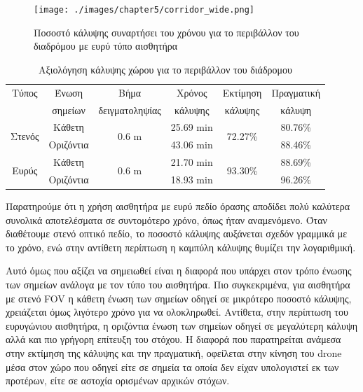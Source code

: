 \begin{figure}[!ht]
    \texttt{[image: ./images/chapter5/corridor\_wide.png]}
    \caption{Ποσοστό κάλυψης συναρτήσει του χρόνου για το περιβάλλον του διαδρόμου με ευρύ τύπο αισθητήρα}
     \label{fig:corridor_wide}
\end{figure} 

\begin{table}[!ht]
    \begin{center}
        \caption{Αξιολόγηση κάλυψης χώρου για το περιβάλλον του διάδρομου}
        \label{tab:coverage_corridor}
        \begin{tabular}{ | c | c | c | c | c | c |}
        \hline
        \rowcolor{Gray}
        Τύπος                   & Ένωση     & Βήμα                        & Χρόνος         & Εκτίμηση                 & Πραγματική \\
        \rowcolor{Gray}
                                & σημείων   & δειγματοληψίας              & κάλυψης        & κάλυψης                  & κάλυψη     \\
        \hline
        \multirow{2}{*}{Στενός} & Κάθετη    & \multirow{2}{*}{0.6 \si{m}} & 25.69 \si{min} & \multirow{2}{*}{72.27\%} & 80.76\%    \\
        \cline{2-2}\cline{4-4}\cline{6-6}
                                & Οριζόντια &                             & 43.06 \si{min} &                          & 88.46\%    \\
        \hline
        \multirow{2}{*}{Ευρύς} & Κάθετη     & \multirow{2}{*}{0.6 \si{m}} & 21.70 \si{min} & \multirow{2}{*}{93.30\%} & 88.69\%    \\
        \cline{2-2}\cline{4-4}\cline{6-6}
                               & Οριζόντια  &                             & 18.93 \si{min} &                          & 96.26\%    \\
        \hline
        \end{tabular}
    \end{center}
\end{table}

Παρατηρούμε ότι η χρήση αισθητήρα με ευρύ πεδίο όρασης αποδίδει πολύ καλύτερα συνολικά αποτελέσματα σε συντομότερο χρόνο, όπως ήταν αναμενόμενο. Όταν διαθέτουμε στενό οπτικό πεδίο, το ποσοστό κάλυψης αυξάνεται σχεδόν γραμμικά με το χρόνο, ενώ στην αντίθετη περίπτωση η καμπύλη κάλυψης θυμίζει την λογαριθμική.
    
Αυτό όμως που αξίζει να σημειωθεί είναι η διαφορά που υπάρχει στον τρόπο ένωσης των σημείων ανάλογα με τον τύπο του αισθητήρα. Πιο συγκεκριμένα, για αισθητήρα με στενό FOV η κάθετη ένωση των σημείων οδηγεί σε μικρότερο ποσοστό κάλυψης, χρειάζεται όμως λιγότερο χρόνο για να ολοκληρωθεί. Αντίθετα, στην περίπτωση του ευρυγώνιου αισθητήρα, η οριζόντια ένωση των σημείων οδηγεί σε μεγαλύτερη κάλυψη αλλά και πιο γρήγορη επίτευξη του στόχου. Η διαφορά που παρατηρείται ανάμεσα στην εκτίμηση της κάλυψης και την πραγματική, οφείλεται στην κίνηση του drone μέσα στον χώρο που οδηγεί είτε σε σημεία τα οποία δεν είχαν υπολογιστεί εκ των προτέρων, είτε σε αστοχία ορισμένων αρχικών στόχων.

